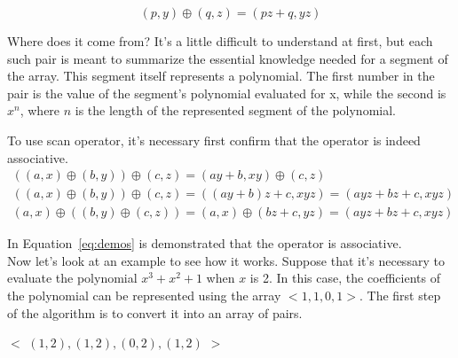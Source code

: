 \documentclass[Ingles]{ic-tese-v1}
\newcommand{\req}[1]{Equation~\ref{eq:#1}}
\begin{document}
\begin{equation}
(p, y) \oplus (q, z) = (p z + q, y z)
\label{eq:opepol}
\end{equation}

Where does it come from? It's a little difficult to understand at first, but
each such pair is meant to summarize the essential knowledge needed for a
segment of the array. This segment itself represents a polynomial. The first
number in the pair is the value of the segment's polynomial evaluated for x,
while the second is $x^{n}$, where $n$ is the length of the represented segment
of the polynomial.

To use scan operator, it's necessary first confirm that the operator is indeed associative.
\begin{equation}
\begin{split}
((a, x) \oplus (b, y)) \oplus (c, z) = (a y + b, x y) \oplus (c, z) \\
((a, x) \oplus (b, y)) \oplus (c, z) = ((a y + b) z + c, x y z) = (a y z + b z + c, x y z)\\
(a, x) \oplus ((b, y) \oplus (c, z)) = (a, x) \oplus (b z + c, y z) = (a y z + b z + c, x y z)
\end{split}
\label{eq:demos}
\end{equation}

In \req{demos} is demonstrated that the operator is associative. \\
Now let's look at an example to see how it works. Suppose that it's necessary to evaluate the
polynomial $x^{3} + x^{2} + 1$ when $x$ is 2. In this case, the coefficients of the
polynomial can be represented using the array $<1, 1, 0, 1>$. The first step of the
algorithm is to convert it into an array of pairs.

$<$ $(1, 2), (1, 2), (0, 2), (1, 2)$ $>$\\
\end{document}
